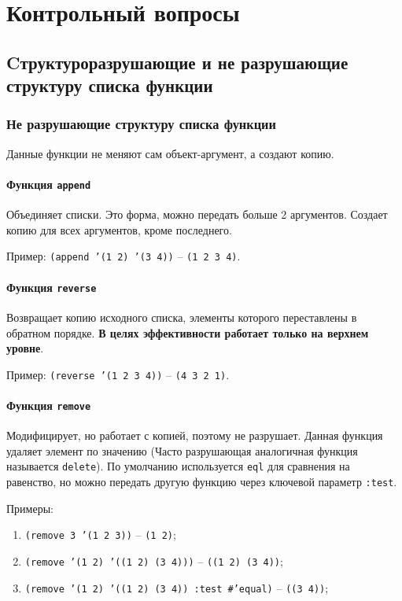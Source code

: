 \chapter{Контрольный вопросы}

\section{Cтруктуроразрушающие и не разрушающие структуру списка функции}

\subsection{Не разрушающие структуру списка функции}

Данные функции не меняют сам объект-аргумент, а создают копию.

\subsubsection{Функция \texttt{append}}

Объединяет списки. Это форма, можно передать больше 2 аргументов. Создает копию для всех аргументов, кроме последнего.

Пример: \texttt{(append '(1 2) '(3 4))} -- \texttt{(1 2 3 4)}.

\subsubsection{Функция \texttt{reverse}}

Возвращает копию исходного списка, элементы которого переставлены в обратном порядке. \textbf{В целях эффективности работает только на верхнем уровне}.

Пример: \texttt{(reverse '(1 2 3 4))} -- \texttt{(4 3 2 1)}.

\subsubsection{Функция \texttt{remove}}

Модифицирует, но работает с копией, поэтому не разрушает. Данная функция удаляет элемент по значению (Часто разрушающая аналогичная функция называется \texttt{delete}). По умолчанию используется \texttt{eql} для сравнения на равенство, но можно передать другую функцию через ключевой параметр \texttt{:test}.

Примеры: 
\begin{enumerate}
    \item \texttt{(remove 3 '(1 2 3))} -- \texttt{(1 2)};
    \item \texttt{(remove '(1 2) '((1 2) (3 4)))} -- \texttt{((1 2) (3 4))};
    \item \texttt{(remove '(1 2) '((1 2) (3 4)) :test \#'equal)} -- \texttt{((3 4))};
\end{enumerate}

